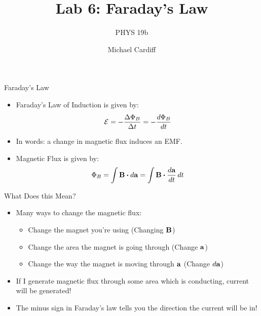 \documentclass{beamer}
\title{Lab 6: Faraday's Law}
\author{Michael Cardiff}
\subtitle{PHYS 19b}
\begin{document}
\begin{frame}
  \titlepage
\end{frame}

\begin{frame}{Faraday's Law}
  \begin{itemize}
  \item Faraday's Law of Induction is given by:
    \begin{align*}
      \mathcal{E}=-\frac{\Delta \Phi_B}{\Delta t}=-\dv{\Phi_B}{t}
    \end{align*}
  \item In words: a change in magnetic flux induces an EMF\@.
  \item Magnetic Flux is given by:
    \begin{align*}
      \Phi_B=\int\vb{B}\vdot\dd{\vb{a}}=\int\vb{B}\vdot\dv{\vb{a}}{t}\dd{t}
    \end{align*}
  \end{itemize}
\end{frame}

\begin{frame}{What Does this Mean?}
  \begin{itemize}
  \item Many ways to change the magnetic flux:
    \begin{itemize}
    \item Change the magnet you're using (Changing $\vb{B}$)
    \item Change the area the magnet is going through (Change $\vb{a}$)
    \item Change the way the magnet is moving through $\vb{a}$ (Change $\dd{\vb{a}}$)
    \end{itemize}
  \item If I generate magnetic flux through some area which is conducting, current will be generated!
  \item The minus sign in Faraday's law tells you the direction the current will be in! 
  \end{itemize}
\end{frame}
\end{document}
